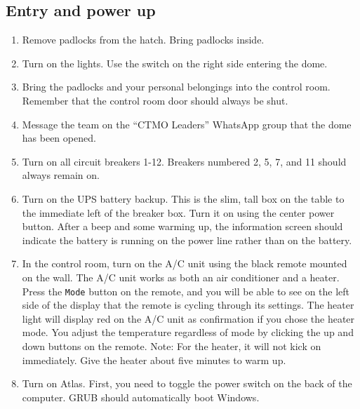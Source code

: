 \documentclass{article}
\begin{document}
	\subsection{Entry and power up}
	\label{sec:entry-and-power-up}
	
	\begin{enumerate}
		
		\item Remove padlocks from the hatch. Bring padlocks inside.
		
		\item Turn on the lights. Use the switch on the right side entering the dome.
		
		\item Bring the padlocks and your personal belongings into the control room. Remember that the control room door should always be shut.
		
		\item Message the team on the ``CTMO Leaders'' WhatsApp group that the dome has been opened.
		
		\item Turn on all circuit breakers 1-12. Breakers numbered 2, 5, 7, and 11 should always remain on.
		
		\item Turn on the UPS battery backup. This is the slim, tall box on the table to the immediate left of the breaker box. Turn it on using the center power button. After a beep and some warming up, the information screen should indicate the battery is running on the power line rather than on the battery.
		
		\item In the control room, turn on the A/C unit using the black remote mounted on the wall. The A/C unit works as both an air conditioner and a heater. Press the \texttt{Mode} button on the remote, and you will be able to see on the left side of the display that the remote is cycling through its settings. The heater light will display red on the A/C unit as confirmation if you chose the heater mode. You adjust the temperature regardless of mode by clicking the up and down buttons on the remote. Note: For the heater, it will not kick on immediately. Give the heater about five minutes to warm up.
		
		\item Turn on Atlas. First, you need to toggle the power switch on the back of the computer. GRUB should automatically boot Windows.
		
	\end{enumerate}
	
\end{document}
